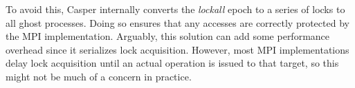 To avoid this, Casper internally converts the \emph{lockall} epoch to
a series of locks to all ghost processes.  Doing so ensures that any
accesses are correctly protected by the MPI implementation.
Arguably, this solution can add some performance overhead since it
serializes lock acquisition.  However, most MPI implementations delay
lock acquisition until an actual operation is issued to that target, so
this might not be much of a concern in practice.





